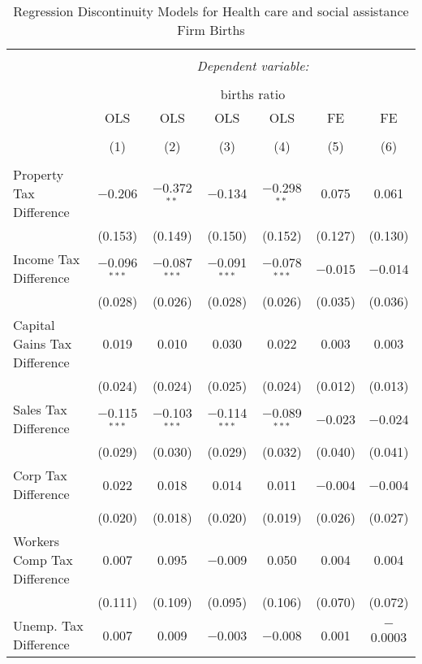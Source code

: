 
\begin{table}[!htbp] \centering 
  \caption{Regression Discontinuity Models for  Health care and social assistance Firm Births} 
  \label{62rd} 
\begin{tabular}{@{\extracolsep{5pt}}lcccccc} 
\\[-1.8ex]\hline 
\hline \\[-1.8ex] 
 & \multicolumn{6}{c}{\textit{Dependent variable:}} \\ 
\cline{2-7} 
\\[-1.8ex] & \multicolumn{6}{c}{births ratio} \\ 
 & OLS & OLS & OLS & OLS & FE & FE \\ 
\\[-1.8ex] & (1) & (2) & (3) & (4) & (5) & (6)\\ 
\hline \\[-1.8ex] 
 Property Tax Difference & $-$0.206 & $-$0.372$^{**}$ & $-$0.134 & $-$0.298$^{**}$ & 0.075 & 0.061 \\ 
  & (0.153) & (0.149) & (0.150) & (0.152) & (0.127) & (0.130) \\ 
  Income Tax Difference & $-$0.096$^{***}$ & $-$0.087$^{***}$ & $-$0.091$^{***}$ & $-$0.078$^{***}$ & $-$0.015 & $-$0.014 \\ 
  & (0.028) & (0.026) & (0.028) & (0.026) & (0.035) & (0.036) \\ 
  Capital Gains Tax Difference & 0.019 & 0.010 & 0.030 & 0.022 & 0.003 & 0.003 \\ 
  & (0.024) & (0.024) & (0.025) & (0.024) & (0.012) & (0.013) \\ 
  Sales Tax Difference & $-$0.115$^{***}$ & $-$0.103$^{***}$ & $-$0.114$^{***}$ & $-$0.089$^{***}$ & $-$0.023 & $-$0.024 \\ 
  & (0.029) & (0.030) & (0.029) & (0.032) & (0.040) & (0.041) \\ 
  Corp Tax Difference & 0.022 & 0.018 & 0.014 & 0.011 & $-$0.004 & $-$0.004 \\ 
  & (0.020) & (0.018) & (0.020) & (0.019) & (0.026) & (0.027) \\ 
  Workers Comp Tax Difference & 0.007 & 0.095 & $-$0.009 & 0.050 & 0.004 & 0.004 \\ 
  & (0.111) & (0.109) & (0.095) & (0.106) & (0.070) & (0.072) \\ 
  Unemp. Tax Difference & 0.007 & 0.009 & $-$0.003 & $-$0.008 & 0.001 & $-$0.0003 \\ 

\end{tabular}
\end{table}
